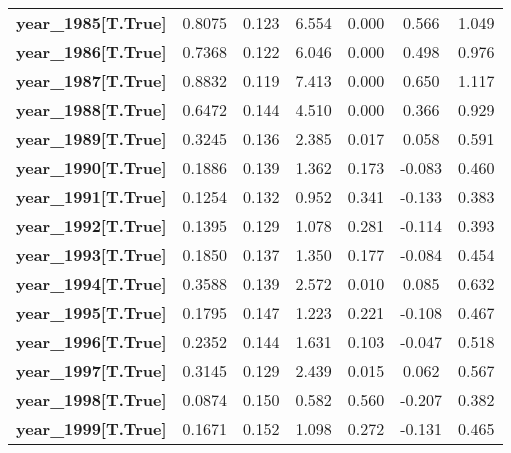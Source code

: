 \begin{center}
\begin{tabular}{lcccccc}
\textbf{year\_1985[T.True]}       &       0.8075  &        0.123     &     6.554  &         0.000        &        0.566    &        1.049     \\
\textbf{year\_1986[T.True]}       &       0.7368  &        0.122     &     6.046  &         0.000        &        0.498    &        0.976     \\
\textbf{year\_1987[T.True]}       &       0.8832  &        0.119     &     7.413  &         0.000        &        0.650    &        1.117     \\
\textbf{year\_1988[T.True]}       &       0.6472  &        0.144     &     4.510  &         0.000        &        0.366    &        0.929     \\
\textbf{year\_1989[T.True]}       &       0.3245  &        0.136     &     2.385  &         0.017        &        0.058    &        0.591     \\
\textbf{year\_1990[T.True]}       &       0.1886  &        0.139     &     1.362  &         0.173        &       -0.083    &        0.460     \\
\textbf{year\_1991[T.True]}       &       0.1254  &        0.132     &     0.952  &         0.341        &       -0.133    &        0.383     \\
\textbf{year\_1992[T.True]}       &       0.1395  &        0.129     &     1.078  &         0.281        &       -0.114    &        0.393     \\
\textbf{year\_1993[T.True]}       &       0.1850  &        0.137     &     1.350  &         0.177        &       -0.084    &        0.454     \\
\textbf{year\_1994[T.True]}       &       0.3588  &        0.139     &     2.572  &         0.010        &        0.085    &        0.632     \\
\textbf{year\_1995[T.True]}       &       0.1795  &        0.147     &     1.223  &         0.221        &       -0.108    &        0.467     \\
\textbf{year\_1996[T.True]}       &       0.2352  &        0.144     &     1.631  &         0.103        &       -0.047    &        0.518     \\
\textbf{year\_1997[T.True]}       &       0.3145  &        0.129     &     2.439  &         0.015        &        0.062    &        0.567     \\
\textbf{year\_1998[T.True]}       &       0.0874  &        0.150     &     0.582  &         0.560        &       -0.207    &        0.382     \\
\textbf{year\_1999[T.True]}       &       0.1671  &        0.152     &     1.098  &         0.272        &       -0.131    &        0.465     \\

\end{tabular}
\end{center}
